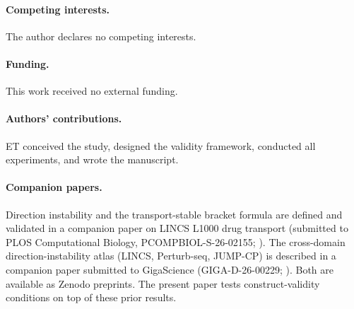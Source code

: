 \documentclass[10pt]{article}
\begin{document}
\paragraph{Competing interests.}
The author declares no competing interests.

\paragraph{Funding.}
This work received no external funding.

\paragraph{Authors' contributions.}
ET conceived the study, designed the validity framework, conducted
all experiments, and wrote the manuscript.

\paragraph{Companion papers.}
Direction instability and the transport-stable bracket formula are
defined and validated in a companion paper on LINCS L1000 drug
transport (submitted to PLOS Computational Biology,
PCOMPBIOL-S-26-02155; \citep{tower2026drug}). The cross-domain
direction-instability atlas (LINCS, Perturb-seq, JUMP-CP) is
described in a companion paper submitted to GigaScience
(GIGA-D-26-00229; \citep{tower2026atlas}). Both are available as
Zenodo preprints. The present paper tests construct-validity
conditions on top of these prior results.



\end{document}
